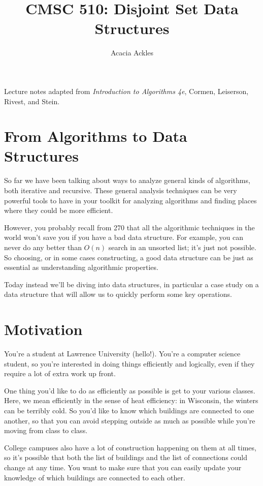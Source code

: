 \documentclass[]{article}
\title{CMSC 510: Disjoint Set Data Structures}
\author{Acacia Ackles}
\begin{document}
    
\maketitle

Lecture notes adapted from \textit{Introduction to Algorithms 4e}, Cormen, Leiserson, Rivest, and Stein.

\section*{From Algorithms to Data Structures}

    So far we have been talking about ways to analyze general kinds of algorithms, both iterative and recursive. These general analysis techniques can be very powerful tools to have in your toolkit for analyzing algorithms and finding places where they could be more efficient. 
    
    However, you probably recall from 270 that all the algorithmic techniques in the world won't save you if you have a bad data structure. For example, you can never do any better than $O(n)$ search in an unsorted list; it's just not possible. So choosing, or in some cases constructing, a good data structure can be just as essential as understanding algorithmic properties.
    
    Today instead we'll be diving into data structures, in particular a case study on a data structure that will allow us to quickly perform some key operations. 

\section*{Motivation}

    You're a student at Lawrence University (hello!). You're a computer science student, so you're interested in doing things efficiently and logically, even if they require a lot of extra work up front. 

    One thing you'd like to do as efficiently as possible is get to your various classes. Here, we mean efficiently in the sense of heat efficiency: in Wisconsin, the winters can be terribly cold. So you'd like to know which buildings are connected to one another, so that you can avoid stepping outside as much as possible while you're moving from class to class.
    
    College campuses also have a lot of construction happening on them at all times, so it's possible that both the list of buildings and the list of connections could change at any time. You want to make sure that you can easily update your knowledge of which buildings are connected to each other. 
\end{document}
